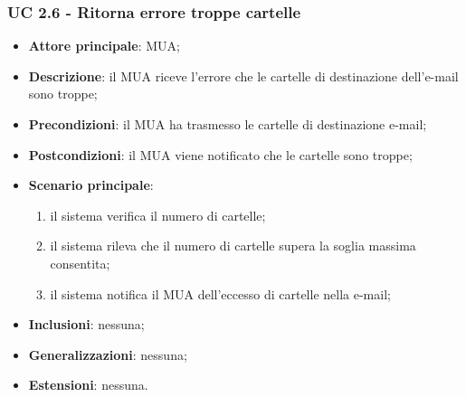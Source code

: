     \subsubsection{UC 2.6 - Ritorna errore troppe cartelle} \label{sec:UC2.6}
    \begin{itemize}
        \item \textbf{Attore principale}: MUA;
        \item \textbf{Descrizione}: il MUA riceve l'errore che le cartelle di destinazione dell'e-mail sono troppe;
        \item \textbf{Precondizioni}: il MUA ha trasmesso le cartelle di destinazione e-mail;
        \item \textbf{Postcondizioni}: il MUA viene notificato che le cartelle sono troppe;
        \item \textbf{Scenario principale}:
            \begin{enumerate}
                \item il sistema verifica il numero di cartelle;
                \item il sistema rileva che il numero di cartelle supera la soglia massima consentita;
                \item il sistema notifica il MUA dell'eccesso di cartelle nella e-mail;
            \end{enumerate}
        \item \textbf{Inclusioni}: nessuna;
        \item \textbf{Generalizzazioni}: nessuna;
        \item \textbf{Estensioni}: nessuna.
    \end{itemize}
